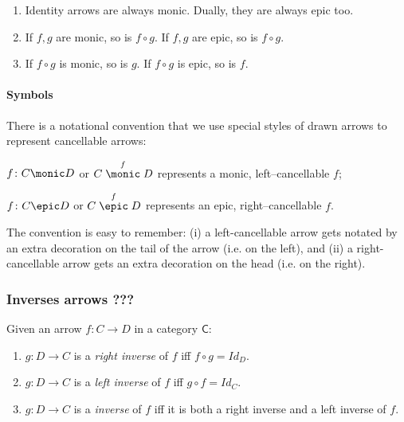 \vspace{2em}


\begin{thm}
	\begin{enumerate}[itemsep=5pt,parsep=5pt,leftmargin=3em,topsep=5pt,label=(\arabic*)] 
		\item 
		Identity arrows are always monic. 
		Dually, 
		they are always epic too.

		\item 
		If $f,g$ are monic, so is $f \circ g$. 
		If $f,g$ are epic, so is $f \circ g$.

		\item 
		If $f \circ g$ is monic, so is $g$. 
		If $f \circ g$ is epic, so is $f$.
	\end{enumerate}
\end{thm}






\paragraph{Symbols} 

There is a notational convention that we use special styles of drawn arrows to represent cancellable arrows:

\begin{center}
{\color{purple} $f \colon C \monic D$} or {\color{purple} $C \stackrel{f}{\monic} D$} represents a monic, left--cancellable $f$; 


{\color{purple} $f \colon C \epic D$} or {\color{purple} $C \stackrel{f}{\epic} D$} represents an epic, right--cancellable $f$.
\end{center}



The convention is easy  to remember: 
(i) a left-cancellable arrow gets notated by an extra decoration on the tail of the arrow (i.e. on the left), 
and  (ii) a right-cancellable arrow gets an extra decoration on the head (i.e. on the right).




\subsubsection{Inverses arrows ???}


\begin{df}[Inverse]
	Given an arrow $f \colon C \to D$ in a category $\mathsf{C}$:
	\begin{enumerate}[itemsep=5pt,parsep=5pt,leftmargin=3em,topsep=5pt,label=(\arabic*)] %
		\item 
		$g \colon D \to C$ is a \textit{right inverse} of $f$ iff $f \circ g = Id_D$.

		\item 
		$g \colon D \to C$ is a \textit{left inverse} of $f$ iff $g \circ f = Id_C$.

		\item 
		$g \colon D \to C$ is a \textit{inverse} of $f$ iff it is both a right inverse and a left inverse of $f$.
	\end{enumerate}	
\end{df}


